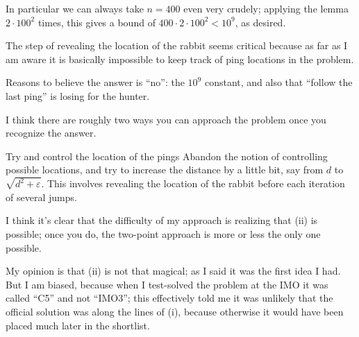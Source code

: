 In particular we can always take $n = 400$ even very crudely;
applying the lemma $2 \cdot 100^2$ times,
this gives a bound of $400 \cdot 2 \cdot 100^2 < 10^9$, as desired.

\begin{remark*}
  The step of revealing the location of the rabbit seems
  critical because as far as I am aware it is basically
  impossible to keep track of ping locations in the problem.
\end{remark*}

\begin{remark*}
  Reasons to believe the answer is ``no'':
  the $10^9$ constant,
  and also that ``follow the last ping'' is losing for the hunter.
\end{remark*}

\begin{remark*}
  I think there are roughly two ways you can approach the problem
  once you recognize the answer.

  \begin{enumerate}[(i)]
    \ii Try and control the location of the pings
    \ii Abandon the notion of controlling possible locations,
    and try to increase the distance by a little bit,
    say from $d$ to $\sqrt{d^2+\varepsilon}$.
    This involves revealing the location of the rabbit
    before each iteration of several jumps.
  \end{enumerate}
  I think it's clear that the difficulty of
  my approach is realizing that (ii) is possible;
  once you do, the two-point approach is more or less the only one possible.

  My opinion is that (ii) is not that magical;
  as I said it was the first idea I had.
  But I am biased, because when I test-solved the problem
  at the IMO it was called ``C5'' and not ``IMO3'';
  this effectively told me it was unlikely that the official solution
  was along the lines of (i),
  because otherwise it would have been placed much later in the shortlist.
\end{remark*}
